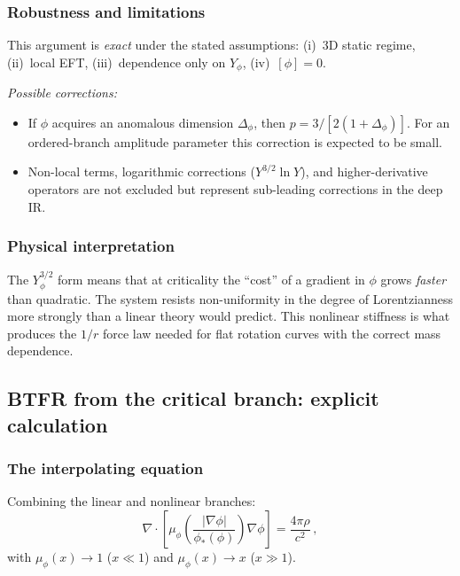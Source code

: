 \documentclass[11pt,a4paper]{article}
\numberwithin{equation}{section}
\begin{document}
\subsubsection{Robustness and limitations}

This argument is \emph{exact} under the stated assumptions:
(i)~3D static regime, (ii)~local EFT,
(iii)~dependence only on $Y_\phi$, (iv)~$[\phi] = 0$.

\emph{Possible corrections:}
\begin{itemize}
\item If $\phi$ acquires an anomalous dimension $\Delta_\phi$,
  then $p = 3/[2(1+\Delta_\phi)]$. For an ordered-branch amplitude parameter this correction is expected to be small.
\item Non-local terms, logarithmic corrections
  ($Y^{3/2}\ln Y$), and higher-derivative operators are not
  excluded but represent sub-leading corrections in the deep IR.
\end{itemize}

\subsubsection{Physical interpretation}

The $Y_\phi^{3/2}$ form means that at criticality the ``cost''
of a gradient in $\phi$ grows \emph{faster} than quadratic.
The system resists non-uniformity in the degree of
Lorentzianness more strongly than a linear theory would predict.
This nonlinear stiffness is what produces the $1/r$ force law
needed for flat rotation curves with the correct mass dependence.


\subsection{BTFR from the critical branch: explicit calculation}
\label{app:lof:btfr_calc}

\subsubsection{The interpolating equation}

Combining the linear and nonlinear branches:
\begin{equation}
\nabla\cdot\left[
  \mu_\phi\!\left(
    \frac{|\nabla\phi|}{\phi_*(\phi)}
  \right)\nabla\phi
\right]
= \frac{4\pi\rho}{c^2}\,,
\label{eq:app_aqual}
\end{equation}
with $\mu_\phi(x) \to 1$ ($x \ll 1$) and
$\mu_\phi(x) \to x$ ($x \gg 1$).
\end{document}
